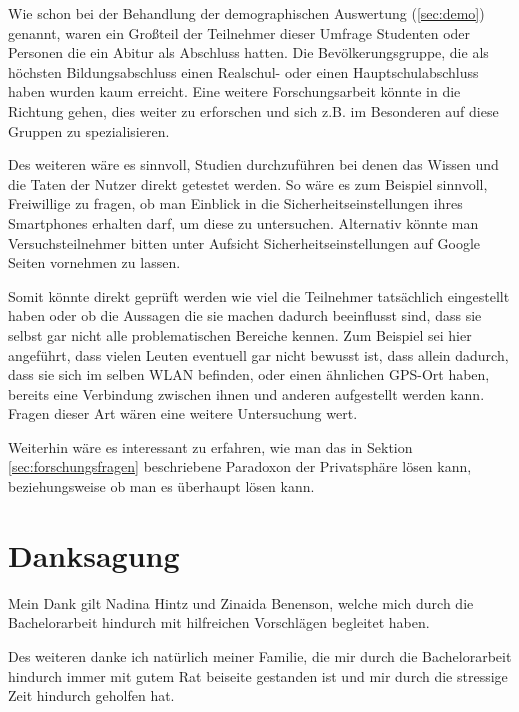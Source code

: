 Wie schon bei der Behandlung der demographischen Auswertung (\ref{sec:demo}) genannt, waren ein Großteil der Teilnehmer dieser Umfrage Studenten oder Personen die ein Abitur als Abschluss hatten. Die Bevölkerungsgruppe, die als höchsten Bildungsabschluss einen Realschul- oder einen Hauptschulabschluss haben wurden kaum erreicht. Eine weitere Forschungsarbeit könnte in die Richtung gehen, dies weiter zu erforschen und sich z.B. im Besonderen auf diese Gruppen zu spezialisieren.

Des weiteren wäre es sinnvoll, Studien durchzuführen bei denen das Wissen und die Taten der Nutzer direkt getestet werden. So wäre es zum Beispiel sinnvoll, Freiwillige zu fragen, ob man Einblick in die Sicherheitseinstellungen ihres Smartphones erhalten darf, um diese zu untersuchen. Alternativ könnte man Versuchsteilnehmer bitten unter Aufsicht Sicherheitseinstellungen auf Google Seiten vornehmen zu lassen.

Somit könnte direkt geprüft werden wie viel die Teilnehmer tatsächlich eingestellt haben oder ob die Aussagen die sie machen dadurch beeinflusst sind, dass sie selbst gar nicht alle problematischen Bereiche kennen. Zum Beispiel sei hier angeführt, dass vielen Leuten eventuell gar nicht bewusst ist, dass allein dadurch, dass sie sich im selben WLAN befinden, oder einen ähnlichen GPS-Ort haben, bereits eine Verbindung zwischen ihnen und anderen aufgestellt werden kann. Fragen dieser Art wären eine weitere Untersuchung wert.

Weiterhin wäre es interessant zu erfahren, wie man das in Sektion \ref{sec:forschungsfragen} beschriebene Paradoxon der Privatsphäre lösen kann, beziehungsweise ob man es überhaupt lösen kann.


\chapter{Danksagung}
Mein Dank gilt Nadina Hintz und Zinaida Benenson, welche mich durch die Bachelorarbeit hindurch mit hilfreichen Vorschlägen begleitet haben.

Des weiteren danke ich natürlich meiner Familie, die mir durch die Bachelorarbeit hindurch immer mit gutem Rat beiseite gestanden ist und mir durch die stressige Zeit hindurch geholfen hat.